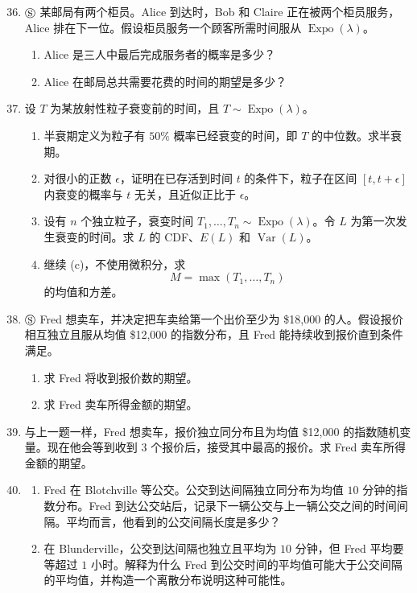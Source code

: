 \documentclass[UTF8,12pt,a4paper,fontset=fandol]{ctexart}
\begin{document}
\begin{enumerate}
  \setcounter{enumi}{35}
  \item $\circledS$ 某邮局有两个柜员。Alice 到达时，Bob 和 Claire 正在被两个柜员服务，Alice 排在下一位。假设柜员服务一个顾客所需时间服从 $\operatorname{Expo}(\lambda)$。
  \begin{enumerate}
    \item Alice 是三人中最后完成服务者的概率是多少？
    \item Alice 在邮局总共需要花费的时间的期望是多少？
  \end{enumerate}

  \item 设 $T$ 为某放射性粒子衰变前的时间，且 $T\sim\operatorname{Expo}(\lambda)$。
  \begin{enumerate}
    \item 半衰期定义为粒子有 $50\%$ 概率已经衰变的时间，即 $T$ 的中位数。求半衰期。
    \item 对很小的正数 $\epsilon$，证明在已存活到时间 $t$ 的条件下，粒子在区间 $[t,t+\epsilon]$ 内衰变的概率与 $t$ 无关，且近似正比于 $\epsilon$。
    \item 设有 $n$ 个独立粒子，衰变时间 $T_1,\ldots,T_n\sim\operatorname{Expo}(\lambda)$。令 $L$ 为第一次发生衰变的时间。求 $L$ 的 CDF、$E(L)$ 和 $\operatorname{Var}(L)$。
    \item 继续 (c)，不使用微积分，求
    \[
      M=\max(T_1,\ldots,T_n)
    \]
    的均值和方差。
  \end{enumerate}

  \item $\circledS$ Fred 想卖车，并决定把车卖给第一个出价至少为 \$18,000 的人。假设报价相互独立且服从均值 \$12,000 的指数分布，且 Fred 能持续收到报价直到条件满足。
  \begin{enumerate}
    \item 求 Fred 将收到报价数的期望。
    \item 求 Fred 卖车所得金额的期望。
  \end{enumerate}

  \item 与上一题一样，Fred 想卖车，报价独立同分布且为均值 \$12,000 的指数随机变量。现在他会等到收到 $3$ 个报价后，接受其中最高的报价。求 Fred 卖车所得金额的期望。

  \item
  \begin{enumerate}
    \item Fred 在 Blotchville 等公交。公交到达间隔独立同分布为均值 $10$ 分钟的指数分布。Fred 到达公交站后，记录下一辆公交与上一辆公交之间的时间间隔。平均而言，他看到的公交间隔长度是多少？
    \item 在 Blunderville，公交到达间隔也独立且平均为 $10$ 分钟，但 Fred 平均要等超过 $1$ 小时。解释为什么 Fred 到公交时间的平均值可能大于公交间隔的平均值，并构造一个离散分布说明这种可能性。
  \end{enumerate}


\end{enumerate}
\end{document}
